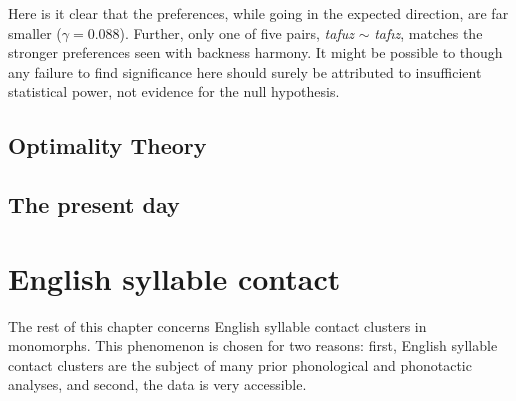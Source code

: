 Here is it clear that the preferences, while going in the expected direction, are far smaller ($\gamma = 0.088$). Further, only one of five pairs, \emph{tafuz} $\sim$ \emph{taf\i z}, matches the stronger preferences seen with backness harmony. It might be possible to though any failure to find significance here should surely be attributed to insufficient statistical power, not evidence for the null hypothesis. 

\subsection{Optimality Theory}

\subsection{The present day}

\section{English syllable contact}

The rest of this chapter concerns English syllable contact clusters in monomorphs. This phenomenon is chosen for two reasons: first, English syllable contact clusters are the subject of many prior phonological and phonotactic analyses, and second, the data is very accessible.


